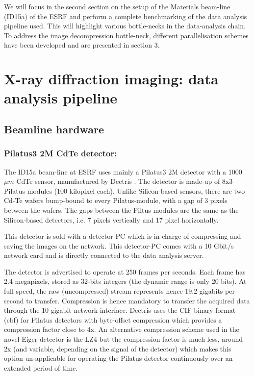 \documentclass[preprint, pdf]{iucr}              %
\begin{document}
We will focus in the second section on the setup of the Materials beam-line
(ID15a) of the ESRF  \cite{id15a} and perform a complete benchmarking of the
data analysis pipeline used. 
This will highlight various bottle-necks in the data-analysis chain.
To address the image decompression bottle-neck, different parallelisation
schemes have been developed and are presented in section 3. 

\section{X-ray diffraction imaging: data analysis pipeline}

\subsection{Beamline hardware}

\subsubsection{Pilatus3 2M CdTe detector:}

The ID15a beam-line at ESRF uses mainly a Pilatus3 2M detector with a 1000 $\mu
m$ CdTe sensor, manufactured by Dectris \cite{pilatus}. 
The detector is made-up of 8x3 Pilatus modules (100 kilopixel each).
Unlike Silicon-based sensors, there are two Cd-Te wafers bump-bound to every
Pilatus-module, with a gap of 3 pixels between the wafers.
The gaps between the Piltus modules are the same as the Silicon-based
detectors, i.e. 7 pixels vertically and 17 pixel horizontally.

This detector is sold with a detector-PC which is in charge of compressing and
saving the images on the network. 
This detector-PC comes with a 10 Gbit/s network card and is directly connected
to the data analysis server.

The detector is advertised to operate at 250 frames per seconds. 
Each frame has 2.4 megapixels, stored as 32-bits integers (the dynamic range is
only 20 bits).
At full speed, the raw (uncompressed) stream represents hence 19.2 gigabits per
second to transfer. 
Compression is hence mandatory to transfer the acquired data through the 10
gigabit network interface.
Dectris uses the CIF binary format (cbf) \cite{cbf} for Pilatus detectors
with byte-offset compression which provides a compression factor close to 4x. 
An alternative compression scheme used in the novel Eiger detector is the LZ4
but the compression factor is much less, around 2x (and variable, depending on
the signal of the detector) which makes this option un-applicable for operating
the Pilatus detector continuously over an extended period of time.
\end{document}
